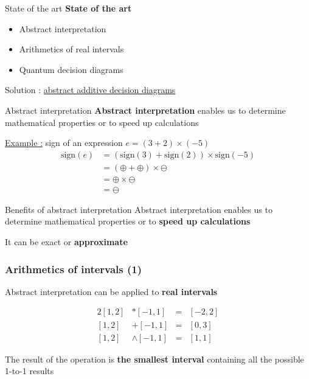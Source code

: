 \begin{frame}{State of the art}
    \textbf{State of the art}
    \begin{itemize}
        \item Abstract interpretation
        \item Arithmetics of real intervals
        \item Quantum decision diagrams
    \end{itemize}
    \pause
    \begin{center}
        Solution : \underline{abstract additive decision diagrams}
    \end{center}
\end{frame}

\begin{frame}{Abstract interpretation}
    \textbf{Abstract interpretation} enables us to determine mathematical properties or to speed up calculations

    \vspace{1em}
    \underline{Example :} sign of an expression $e = (3 + 2) \times (-5)$
    \begin{align*}
        \text{sign}(e) &= (\text{sign}(3) + \text{sign}(2)) \times \text{sign}(-5) \\
        &= (\oplus + \oplus) \times \ominus \\
        &= \oplus \times \ominus \\
        &= \ominus
    \end{align*}
\end{frame}

\begin{frame}{Benefits of abstract interpretation}
    Abstract interpretation enables us to determine mathematical properties or to \textbf{speed up calculations}

    \vspace{1em}

    It can be exact or \textbf{approximate}
\end{frame}

\begin{frame}
    \frametitle{Arithmetics of intervals (1)}

    Abstract interpretation can be applied to \textbf{real intervals}

    \begin{alignat*}{2}
    [1, 2] &* [-1, 1] &=& [-2, 2] \\
    [1, 2] &+ [-1, 1] &=& [0, 3] \\
    [1, 2] &\land [-1, 1] &=& [1, 1]
    \end{alignat*}

    \small{The result of the operation is \textbf{the smallest interval} containing all the possible 1-to-1 results}
\end{frame}

